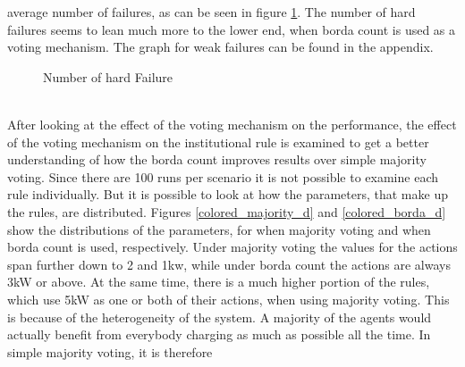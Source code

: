 \documentclass[a4paper]{article}
\begin{document}
average number of failures, as can be seen in figure \ref{d_hard}. The number of hard failures seems to lean 
much more to the lower end, when borda count is used as a voting mechanism. The graph for weak failures can be found 
in the appendix. \\
\begin{figure}[!ht]
\caption{Number of hard Failure}
\label{d_hard}
\end{figure}\\
After looking at the effect of the voting mechanism on the performance, the effect of the voting mechanism on the institutional rule 
is examined to get a better understanding of how the borda count improves results over simple majority voting. 
Since there are 100 runs per scenario it is not possible to examine each rule individually.
But it is possible to look at how the parameters, that make up the rules, are distributed. 
Figures \ref{colored_majority_d} and \ref{colored_borda_d} show the distributions of the parameters, for when majority voting and when 
borda count is used, respectively. Under majority voting the values for the actions span further down to 2 and 1kw, while under borda 
count the actions are always 3kW or above. At the same time, there is a much higher portion of the rules, which use 5kW as one 
or both of their actions, when using majority voting. This is because of the heterogeneity of the system. A majority of the agents 
would actually benefit from everybody charging as much as possible all the time. In simple majority voting, it is therefore 
\end{document}
